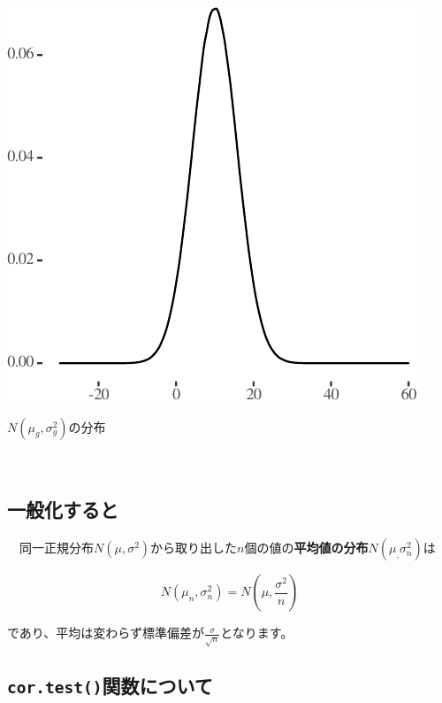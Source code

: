 \documentclass[a4paper]{tufte-handout}
\begin{document}
\begin{marginfigure}

{\centering \includegraphics{AdditivityOfVariance_files/figure-latex/unnamed-chunk-14-1} 

}

\caption[$N(\mu_g, \sigma^2_g)$の分布]{$N(\mu_g, \sigma^2_g)$の分布}\label{fig:unnamed-chunk-14}
\end{marginfigure}

　

\hypertarget{ux4e00ux822cux5316ux3059ux308bux3068}{%
\subsection{\texorpdfstring{\textbf{一般化すると}}{一般化すると}}\label{ux4e00ux822cux5316ux3059ux308bux3068}}

　同一正規分布\(N(\mu, \sigma^2)\)から取り出した\(n\)個の値の\textbf{平均値の分布}\(N(\mu_, \sigma^2_n)\)は

\[N(\mu_n, \sigma^2_n) = N(\mu, \frac{\sigma^2}{n})\]

であり、平均は変わらず標準偏差が\(\frac{\sigma}{\sqrt{n}}\)となります。

\newpage

\hypertarget{cor.testux95a2ux6570ux306bux3064ux3044ux3066}{%
\subsection{\texorpdfstring{\texttt{cor.test()}関数について}{cor.test()関数について}}\label{cor.testux95a2ux6570ux306bux3064ux3044ux3066}}
\end{document}
